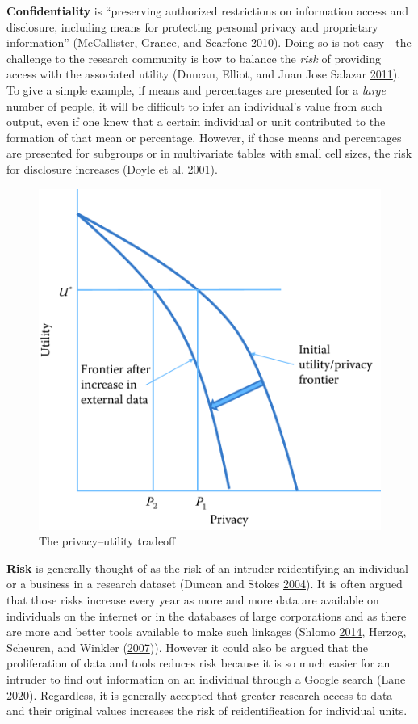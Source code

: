 \documentclass[]{krantz}
\begin{document}
\textbf{Confidentiality} is ``preserving authorized restrictions on
information access and disclosure, including means for protecting
personal privacy and proprietary information'' (McCallister, Grance, and
Scarfone \protect\hyperlink{ref-mccallister2010sp}{2010}). Doing so is
not easy---the challenge to the research community is how to balance the
\emph{risk} of providing access with the associated utility (Duncan,
Elliot, and Juan Jose Salazar
\protect\hyperlink{ref-duncanstatistical}{2011}). To give a simple
example, if means and percentages are presented for a \emph{large}
number of people, it will be difficult to infer an individual's value
from such output, even if one knew that a certain individual or unit
contributed to the formation of that mean or percentage. However, if
those means and percentages are presented for subgroups or in
multivariate tables with small cell sizes, the risk for disclosure
increases (Doyle et al.
\protect\hyperlink{ref-doyle2001confidentiality}{2001}).

\begin{figure}

{\centering \includegraphics[width=0.7\linewidth]{ChapterPrivacy/figures/fig11-1} 

}

\caption{The privacy--utility tradeoff}\label{fig:fig11-1}
\end{figure}

\textbf{Risk} is generally thought of as the risk of an intruder
reidentifying an individual or a business in a research dataset (Duncan
and Stokes \protect\hyperlink{ref-duncan2004disclosure}{2004}). It is
often argued that those risks increase every year as more and more data
are available on individuals on the internet or in the databases of
large corporations and as there are more and better tools available to
make such linkages (Shlomo
\protect\hyperlink{ref-shlomo2014probabilistic}{2014}, Herzog, Scheuren,
and Winkler (\protect\hyperlink{ref-herzog2007data}{2007})). However it
could also be argued that the proliferation of data and tools reduces
risk because it is so much easier for an intruder to find out
information on an individual through a Google search (Lane
\protect\hyperlink{ref-Lane2020}{2020}). Regardless, it is generally
accepted that greater research access to data and their original values
increases the risk of reidentification for individual units.
\end{document}
